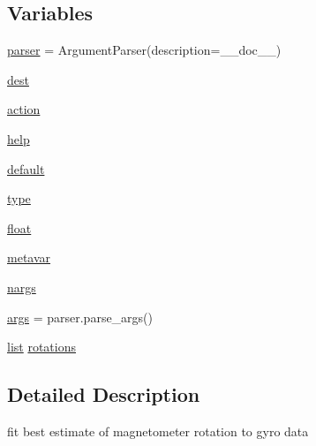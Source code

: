 \subsection*{Variables}
\begin{DoxyCompactItemize}
\item 
\mbox{\hyperlink{namespacepymavlink_1_1tools_1_1magfit__rotation__gyro_a8432b0357247a5eb4791c6296e678f22}{parser}} = Argument\+Parser(description=\+\_\+\+\_\+doc\+\_\+\+\_\+)
\item 
\mbox{\hyperlink{namespacepymavlink_1_1tools_1_1magfit__rotation__gyro_a3d689679b4cd3d263e2cca1ca1b1f8b5}{dest}}
\item 
\mbox{\hyperlink{namespacepymavlink_1_1tools_1_1magfit__rotation__gyro_a4cdc3788f5093934f2722388d1463508}{action}}
\item 
\mbox{\hyperlink{namespacepymavlink_1_1tools_1_1magfit__rotation__gyro_aae9e0cf2f804dd771097e11c8327d328}{help}}
\item 
\mbox{\hyperlink{namespacepymavlink_1_1tools_1_1magfit__rotation__gyro_a7c2604e6f258e7f6aa3f8281e054aa5f}{default}}
\item 
\mbox{\hyperlink{namespacepymavlink_1_1tools_1_1magfit__rotation__gyro_ad09874ef50e2ba74d3128b3dfb17bff5}{type}}
\item 
\mbox{\hyperlink{namespacepymavlink_1_1tools_1_1magfit__rotation__gyro_a4bcc06ecf610261f589da0ebc3606788}{float}}
\item 
\mbox{\hyperlink{namespacepymavlink_1_1tools_1_1magfit__rotation__gyro_a210741e7197d467870e87988678947fa}{metavar}}
\item 
\mbox{\hyperlink{namespacepymavlink_1_1tools_1_1magfit__rotation__gyro_ab0d530e5042786764b481c8e16edc038}{nargs}}
\item 
\mbox{\hyperlink{namespacepymavlink_1_1tools_1_1magfit__rotation__gyro_a27834f9ffa92cdae1fa567e5898adb84}{args}} = parser.\+parse\+\_\+args()
\item 
\mbox{\hyperlink{structlist}{list}} \mbox{\hyperlink{namespacepymavlink_1_1tools_1_1magfit__rotation__gyro_a5c1736b19d46521b3acc4397d60cd1d7}{rotations}}
\end{DoxyCompactItemize}


\subsection{Detailed Description}
\begin{DoxyVerb}fit best estimate of magnetometer rotation to gyro data
\end{DoxyVerb}
 


